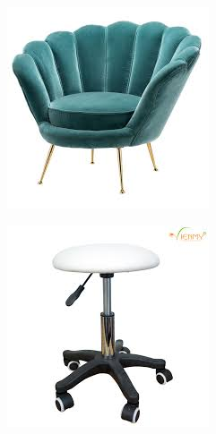 \begin{figure}[h!]
\begin{subfigure}[b]{0.2\linewidth}
		\includegraphics[width=\linewidth]{images/chairs/1.jpeg}
	\end{subfigure}
	\begin{subfigure}[b]{0.2\linewidth}
		\includegraphics[width=\linewidth]{images/chairs/2.jpeg}
	\end{subfigure}
	

\end{figure}

